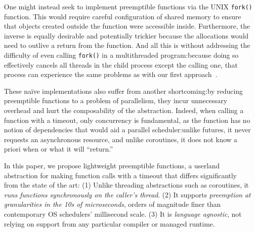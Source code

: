 One might instead seek to implement preemptible functions via the UNIX
\texttt{fork()} function.  This would require careful configuration of shared memory
to ensure that objects created outside the function were accessible inside.
Furthermore, the inverse is equally desirable and potentially trickier because the
allocations would need to outlive a return from the function.  And all this is
without addressing the difficulty of even calling \texttt{fork()} in a multithreaded
program:\@ because doing so effectively cancels all threads in the child process
except the calling one, that process can experience the same problems as with our
first approach~\cite{baumann:hotos2019}.

These na\"ive implementations also suffer from another shortcoming:\@ by reducing
preemptible functions to a problem of parallelism, they incur unnecessary overhead
and hurt the composability of the abstraction.  Indeed, when calling a function with
a timeout, only concurrency is fundamental, as the function has no notion of
dependencies that would aid a parallel scheduler:\@ unlike futures, it never requests
an asynchronous resource, and unlike coroutines, it does not know a priori when or
what it will ``return.''

In this paper, we propose lightweight preemptible functions, a userland abstraction
for making function calls with a timeout that differs significantly from the state of
the art:  (1) Unlike threading abstractions such as coroutines, it \textit{runs
functions synchronously on the caller's thread}.  (2) It supports \textit{preemption
at granularities in the 10s of microseconds}, orders of magnitude finer than
contemporary OS schedulers' millisecond scale.  (3) It is \textit{language agnostic},
not relying on support from any particular compiler or managed runtime.
